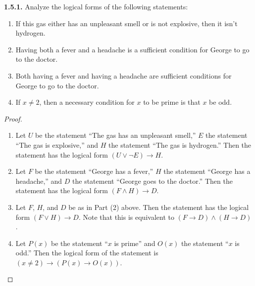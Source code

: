 \documentclass[12pt]{amsart}
\newenvironment{statement}[1]{\smallskip\noindent\color[rgb]{.6627, .3529, .6314} {\bf #1.}}{}
\theoremstyle{definition}
\theoremstyle{remark}
\begin{document}
\begin{statement}{1.5.1}
Analyze the logical forms of the following statements:
\begin{enumerate}
	\item If this gas either has an unpleasant smell or is not explosive, then it isn't hydrogen.
	
	\item Having both a fever and a headache is a sufficient condition for George to go to the doctor.
	
	\item Both having a fever and having a headache are sufficient conditions for George to go to the doctor.
	
	\item If $x \neq 2$, then a necessary condition for $x$ to be prime is that $x$ be odd.
\end{enumerate}
\end{statement}

\begin{proof}
\hfill
\begin{enumerate}
	\item Let $U$ be the statement ``The gas has an unpleasant smell,'' $E$ the statement ``The gas is explosive,'' and $H$ the statement ``The gas is hydrogen.''
	Then the statement has the logical form $(U \vee \neg E) \rightarrow H$.
	
	\item Let $F$ be the statement ``George has a fever,'' $H$ the statement ``George has a headache,'' and $D$ the statement ``George goes to the doctor.''
	Then the statement has the logical form $(F \wedge H) \rightarrow D$.
	
	\item Let $F$, $H$, and $D$ be as in Part (2) above.
	Then the statement has the logical form $(F \vee H) \rightarrow D$.
	Note that this is equivalent to $(F \rightarrow D) \wedge (H \rightarrow D)$.
	
	\item Let $P(x)$ be the statement ``$x$ is prime'' and $O(x)$ the statement ``$x$ is odd.''
	Then the logical form of the statement is $(x \neq 2) \rightarrow (P(x) \rightarrow O(x))$.
\end{enumerate}
\end{proof}
\end{document}
